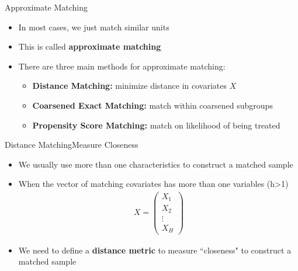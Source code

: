\documentclass[dvipsnames,hyperref={pdfpagelabels=false}]{beamer}
\begin{document}
\begin{frame}{Approximate Matching}{}
	\begin{itemize}
		
		\item In most cases, we just match similar units 
		\vspace{0.2cm}	
		\item This is called \textbf{approximate matching}
		\vspace{0.2cm}	
		\item There are three main methods for approximate matching:
				\vspace{0.2cm}	
		\begin{itemize}
			\item[1] \textbf{Distance Matching:} minimize distance in covariates $X$
			\vspace{0.2cm}
			\item[2] \textbf{Coarsened Exact Matching:}	match within coarsened subgroups
			\vspace{0.2cm}
			\item[3] \textbf{Propensity Score Matching:} match on likelihood of being treated
						
		\end{itemize}
	\end{itemize}
\end{frame}


\begin{frame}{Distance Matching}{Measure Closeness}
\begin{itemize}
	
\item We usually use more than one characteristics to construct a matched sample
\vspace{0.2cm}	
\item When the vector of matching covariates has more than one variables (h>1) 
	\begin{align*}
	X=\left(
	\begin{array}{c}
	X_1\\X_2\\\vdots\\X_H
	\end{array}\right)
	\end{align*}

\item We need to define a \textbf{distance metric} to measure ``closeness" to construct a matched sample

\end{itemize}
\end{frame}
\end{document}
